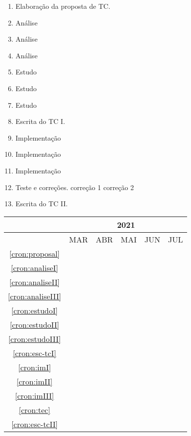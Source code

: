 \begin{enumerate}
	\item \label{cron:proposal} Elaboração da proposta de TC.
	\item \label{cron:analiseI} Análise 
	\item \label{cron:analiseII} Análise
	\item \label{cron:analiseIII} Análise 
	\item \label{cron:estudoI} Estudo
	\item \label{cron:estudoII}  Estudo 
	\item \label{cron:estudoIII} Estudo
	\item \label{cron:esc-tcI}  Escrita do TC I.
	\item \label{cron:imI} Implementação
	\item \label{cron:imII} Implementação
	\item \label{cron:imIII} Implementação
	\item \label{cron:tec} Teste e correções.
		\subitem correção 1
		\subitem correção 2
	\item \label{cron:esc-tcII} Escrita do TC II.
\end{enumerate}

\begin{table}[!htbp]
	\centering
		\begin{tabular}{|c|c|c|c|c|c|}
		\hline
		&\multicolumn{5}{c|}{2021}\\
		\hline
		&MAR&ABR&MAI&JUN&JUL\\
		\hline
		\ref{cron:proposal}&\cellcolor{midgray}&&&&\\
		\hline
		\ref{cron:analiseI}&&\cellcolor{midgray}&&&\\
		\hline	
		\ref{cron:analiseII}&&\cellcolor{midgray}&&&\\
		\hline			
		\ref{cron:analiseIII}&&\cellcolor{midgray}&\cellcolor{midgray}&&\\
		\hline	
		\ref{cron:estudoI}&&&\cellcolor{midgray}&&\\
		\hline
		\ref{cron:estudoII}&&&\cellcolor{midgray}&\cellcolor{midgray}&\\
		\hline	
		\ref{cron:estudoIII}&&&\cellcolor{midgray}&\cellcolor{midgray}&\\
		\hline	
		\ref{cron:esc-tcI}&\cellcolor{midgray}&\cellcolor{midgray}&\cellcolor{midgray}&&\\
		\hline	
		\ref{cron:imI}&&&&\cellcolor{midgray}&\\
		\hline	
		\ref{cron:imII}&&\cellcolor{midgray}&&&\\
		\hline	
		\ref{cron:imIII}&&\cellcolor{midgray}&\cellcolor{midgray}&\cellcolor{midgray}&\\
		\hline	
		\ref{cron:tec}&&&\cellcolor{midgray}&\cellcolor{midgray}&\\
		\hline	
		\ref{cron:esc-tcII}&&&\cellcolor{midgray}&\cellcolor{midgray}&\cellcolor{midgray}\\
		\hline	
		\end{tabular}
\end{table}

